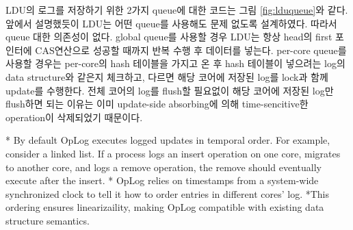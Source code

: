 LDU의 로그를 저장하기 위한 2가지 queue에 대한 코드는 그림 \ref{fig:lduqueue}와 같다. 
앞에서 설명했듯이 LDU는 어떤 queue를 사용해도 문제 없도록 설계하였다.
따라서 queue 대한 의존성이 없다.
global queue를 사용할 경우 LDU는 항상 head의 first 포인터에 CAS연산으로 성공할 때까지 반복 수행 후 데이터를 넣는다. 
per-core queue를 사용할 경우는 per-core의 hash 테이블을 가지고 온 후 hash 테이블이 넣으려는 log의
data structure와 같은지 체크하고, 다르면 해당 코어에 저장된 log를 lock과 함께 update를 수행한다.
전체 코어의 log를 flush할 필요없이 해당 코어에 저장된 log만 flush하면 되는 이유는 이미 update-side
absorbing에 의해 time-sencitive한 operation이 삭제되었기 때문이다.
\fi



\ifkor
\else
* By default OpLog executes logged updates in temporal order. For example,
consider a linked list. If a process logs an insert operation on one core,
migrates to another core, and logs a remove operation, the remove should
eventually execute after the insert.
* OpLog relies on timestamps from a system-wide synchronized clock to tell it
how to order entries in different cores' log.
*This ordering ensures linearizaility, making OpLog compatible with existing
data structure semantics.
\fi









